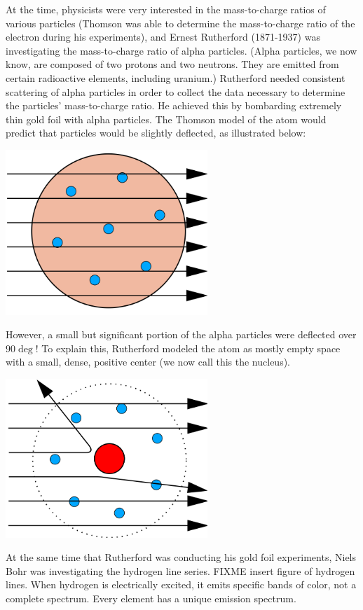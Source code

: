 At the time, physicists were very interested in the mass-to-charge ratios of
various particles (Thomson was able to determine the mass-to-charge ratio of the
electron during his experiments), and Ernest Rutherford (1871-1937) was
investigating the mass-to-charge ratio of alpha particles. (Alpha particles, we
now know, are composed of two protons and two neutrons. They are emitted from
certain radioactive elements, including uranium.) Rutherford needed consistent
scattering of alpha particles in order to collect the data necessary to determine
the particles' mass-to-charge ratio. He achieved this by bombarding extremely
thin gold foil with alpha particles. The Thomson model of the atom would predict
that particles would be slightly deflected, as illustrated below:

\includegraphics[width=3in]{thomson_gold.png}

However, a small but significant portion of the alpha particles were deflected
over $90 \deg$! To explain this, Rutherford modeled the atom as mostly empty
space with a small, dense, positive center (we now call this the nucleus).

\includegraphics[width=3in]{rutherford_gold.png}


At the same time that Rutherford was conducting his gold foil experiments, Niels
Bohr was investigating the hydrogen line series. FIXME insert figure of hydrogen
lines. When hydrogen is electrically excited, it emits specific bands of color,
not a complete spectrum. Every element has a unique emission spectrum.

